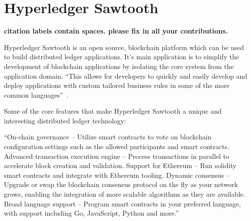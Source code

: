 \section{Hyperledger Sawtooth}


{\bf citation labels contain spaces. please fix in all your contributions.}

Hyperledger Sawtooth is an open source, blockchain platform which can
be used to build distributed ledger applications. It’s main
application is to simplify the development of blockchain applications
by isolating the core system from the application domain. ``This
allows for developers to quickly and easily develop and deploy
applications with custom tailored business rules in some of the more
common languages''~\cite{Hyperledger Sawtooth}.

Some of the core features that make Hyperledger Sawtooth a unique and
interesting distributed ledger technology:
  
``On-chain governance – Utilize smart contracts to vote on blockchain
configuration settings such as the allowed participants and smart
contracts.  Advanced transaction execution engine – Process
transactions in parallel to accelerate block creation and validation.
Support for Ethereum – Run solidity smart contracts and integrate with
Ethereum tooling.  Dynamic consensus – Upgrade or swap the blockchain
consensus protocol on the fly as your network grows, enabling the
integration of more scalable algorithms as they are available.  Broad
language support – Program smart contracts in your preferred language,
with support including Go, JavaScript, Python and 
more.''~\cite{Linux Foundation Sawtooth}
